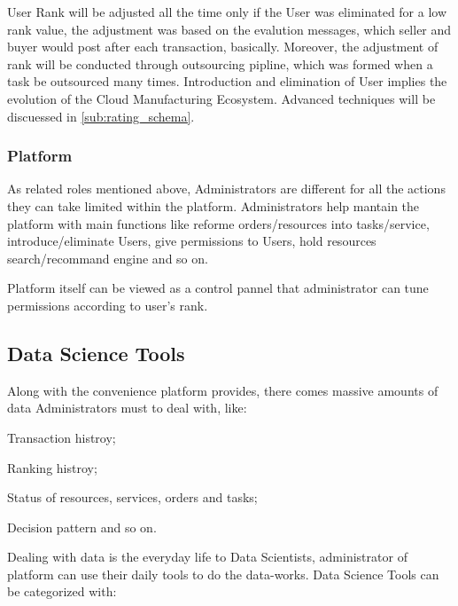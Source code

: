 User Rank will be adjusted all the time only if the User was eliminated for a low rank value, the adjustment was based on the evalution messages, which seller and buyer would post after each transaction, basically. Moreover, the adjustment of rank will be conducted through outsourcing pipline, which was formed when a task be outsourced many times. Introduction and elimination of User implies the evolution of the Cloud Manufacturing Ecosystem. Advanced techniques will be discuessed in \autoref{sub:rating_schema}.

\subsubsection{Platform}
As related roles mentioned above, Administrators are different for all the actions they can take limited within the platform. Administrators help mantain the platform with main functions like reforme orders/resources into tasks/service, introduce/eliminate Users, give permissions to Users, hold resources search/recommand engine and so on.

Platform itself can be viewed as a control pannel that administrator can tune permissions according to user's rank. 

\subsection{Data Science Tools}
Along with the convenience platform provides, there comes massive amounts of data Administrators must to deal with, like:
\begin{inparaenum}[1)]
  \item Transaction histroy;
  \item Ranking histroy;
  \item Status of resources, services, orders and tasks;
  \item Decision pattern and so on.
\end{inparaenum}

Dealing with data is the everyday life to Data Scientists, administrator of platform can use their daily tools to do the data-works. Data Science Tools can be categorized with:


